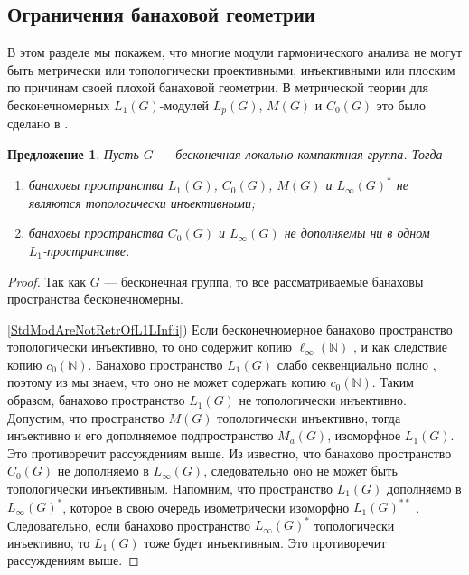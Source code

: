 \documentclass{article}
\numberwithin{equation}{section}
\theoremstyle{plain}
\newtheorem{propos}{Предложение}
\theoremstyle{definition}
\newtheorem{proof}{Доказательство}\def\theproof{}
\begin{document}
\begin{fulltext}

\section{Ограничения банаховой геометрии}
\label{SubSectionBanachGeometricRestriction}

В этом разделе мы покажем, что многие модули гармонического анализа не могут 
быть метрически или топологически проективными, инъективными или плоским 
по причинам своей плохой банаховой геометрии. В метрической теории для 
бесконечномерных $L_1(G)$-модулей $L_p(G)$, $M(G)$ и $C_0(G)$ это было 
сделано в \cite[теоремы~4.12--4.14]{GravInjProjBanMod}.
 
\begin{propos}\label{StdModAreNotRetrOfL1LInf} Пусть $G$ --- бесконечная 
локально компактная группа. Тогда
\begin{enumerate}
    \item банаховы пространства $L_1(G)$, $C_0(G)$, $M(G)$ и 
    $L_\infty(G)^*$ не являются топологически инъективными;
    \label{StdModAreNotRetrOfL1LInf:i}
    \item банаховы пространства $C_0(G)$ и $L_\infty(G)$ не 
    дополняемы ни в одном \\$L_1$-пространстве.
    \label{StdModAreNotRetrOfL1LInf:ii}
\end{enumerate}
\end{propos}
\begin{proof}
Так как $G$ --- бесконечная группа, то все рассматриваемые банаховы 
пространства бесконечномерны.

\ref{StdModAreNotRetrOfL1LInf:i}) Если бесконечномерное банахово пространство 
топологически инъективно, то оно содержит копию $\ell_\infty(\mathbb{N})$ 
\cite[следствие~1.1.4]{RosOnRelDisjFamOfMeas}, и как следствие 
копию $c_0(\mathbb{N})$. Банахово пространство $L_1(G)$ слабо 
секвенциально полно \cite[следствие~III.C.14]{WojBanSpForAnalysts}, 
поэтому из \cite[следствие~5.2.11]{KalAlbTopicsBanSpTh} мы знаем, 
что оно не может содержать копию $c_0(\mathbb{N})$. Таким образом, 
банахово пространство $L_1(G)$ не топологически инъективно. Допустим, 
что пространство $M(G)$ топологически инъективно, тогда инъективно и 
его дополняемое подпространство $M_a(G)$, изоморфное $L_1(G)$. Это 
противоречит рассуждениям выше. Из 
\cite[следствие~3]{LauMingComplSubspInLInfOfG} известно, что банахово 
пространство $C_0(G)$ не дополняемо в $L_\infty(G)$, следовательно оно 
не может быть топологически инъективным. Напомним, что пространство 
$L_1(G)$ дополняемо в $L_\infty(G)^*$, которое в свою очередь 
изометрически изоморфно $L_1(G)^{**}$ \cite[предложение~B10]{DefFloTensNorOpId}. 
Следовательно, если банахово пространство $L_\infty(G)^*$ топологически 
инъективно, то $L_1(G)$ тоже будет инъективным. Это противоречит 
рассуждениям выше.


\end{proof}
\end{fulltext}
\end{document}
